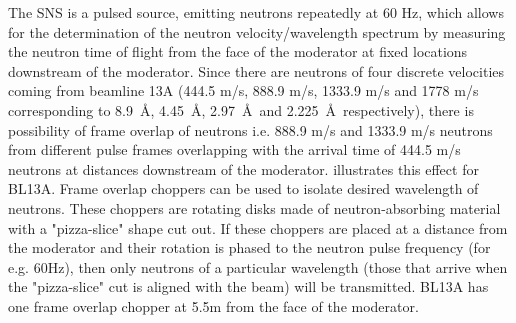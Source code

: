 

The SNS is a pulsed source, emitting neutrons repeatedly at 60 Hz, which allows for the determination of the neutron velocity/wavelength spectrum by measuring the neutron time of flight from the face of the moderator at fixed locations downstream of the moderator. Since there are neutrons of four discrete velocities coming from beamline 13A (444.5 m/s, 888.9 m/s, 1333.9 m/s and 1778 m/s corresponding to 8.9~\AA, 4.45~\AA, 2.97~\AA\ and 2.225~\AA\ respectively), there is possibility of frame overlap of neutrons i.e. 888.9 m/s and 1333.9 m/s neutrons from different pulse frames overlapping with the arrival time of 444.5 m/s neutrons at distances downstream of the moderator.  illustrates this effect for BL13A. Frame overlap choppers can be used to isolate desired wavelength of neutrons. These choppers are rotating disks made of neutron-absorbing material with a "pizza-slice" shape cut out. If these choppers are placed at a distance from the moderator and their rotation is phased to the neutron pulse frequency (for e.g. 60Hz), then only neutrons of a particular wavelength (those that arrive when the "pizza-slice" cut is aligned with the beam) will be transmitted. BL13A has one frame overlap chopper at 5.5m from the face of the moderator.

